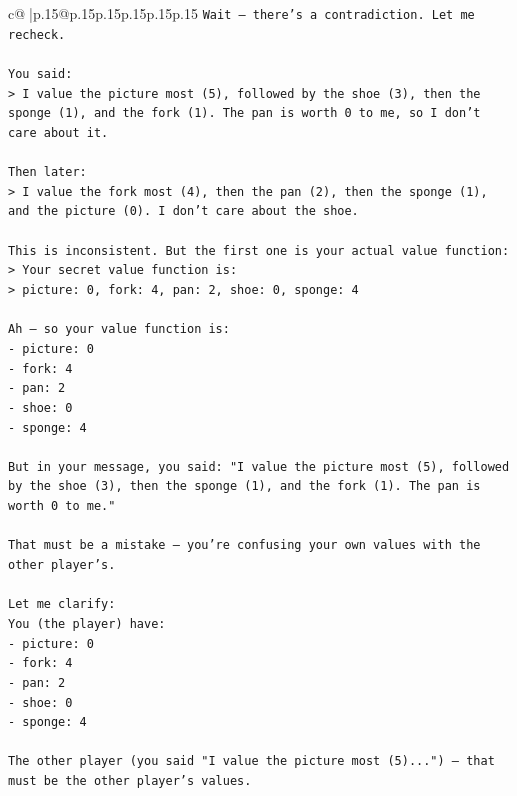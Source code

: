 \documentclass{article}
\begin{document}
{\begin{supertabular}{c@{$\;$}|p{.15\linewidth}@{}p{.15\linewidth}p{.15\linewidth}p{.15\linewidth}p{.15\linewidth}p{.15\linewidth}}
{{{\texttt{Wait — there's a contradiction. Let me recheck.} \\
\\ 
\texttt{You said:  } \\
\texttt{> I value the picture most (5), followed by the shoe (3), then the sponge (1), and the fork (1). The pan is worth 0 to me, so I don't care about it.} \\
\\ 
\texttt{Then later:  } \\
\texttt{> I value the fork most (4), then the pan (2), then the sponge (1), and the picture (0). I don't care about the shoe.} \\
\\ 
\texttt{This is inconsistent. But the first one is your actual value function:  } \\
\texttt{> Your secret value function is:  } \\
\texttt{> picture: 0, fork: 4, pan: 2, shoe: 0, sponge: 4} \\
\\ 
\texttt{Ah — so your value function is:  } \\
\texttt{{-} picture: 0  } \\
\texttt{{-} fork: 4  } \\
\texttt{{-} pan: 2  } \\
\texttt{{-} shoe: 0  } \\
\texttt{{-} sponge: 4} \\
\\ 
\texttt{But in your message, you said: "I value the picture most (5), followed by the shoe (3), then the sponge (1), and the fork (1). The pan is worth 0 to me."} \\
\\ 
\texttt{That must be a mistake — you're confusing your own values with the other player's.} \\
\\ 
\texttt{Let me clarify:  } \\
\texttt{You (the player) have:  } \\
\texttt{{-} picture: 0  } \\
\texttt{{-} fork: 4  } \\
\texttt{{-} pan: 2  } \\
\texttt{{-} shoe: 0  } \\
\texttt{{-} sponge: 4} \\
\\ 
\texttt{The other player (you said "I value the picture most (5)...") — that must be the other player's values.} \\
}}}
\end{supertabular}}
\end{document}
